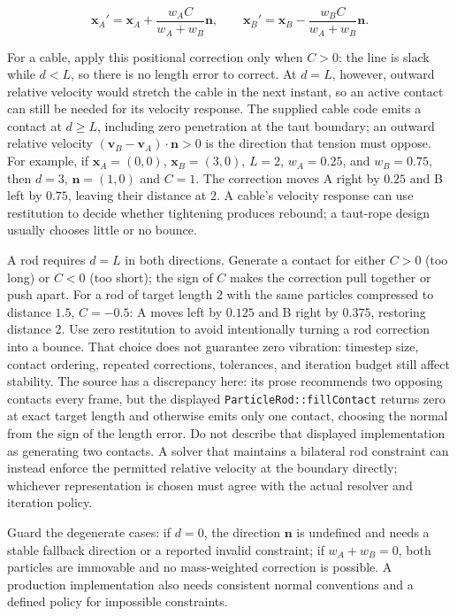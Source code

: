 \[
\mathbf{x}_A' = \mathbf{x}_A + \frac{w_A C}{w_A+w_B}\mathbf{n}, \qquad
\mathbf{x}_B' = \mathbf{x}_B - \frac{w_B C}{w_A+w_B}\mathbf{n}.
\]

For a cable, apply this positional correction only when \(C>0\): the line is slack while \(d<L\), so there is no length error to correct. At \(d=L\), however, outward relative velocity would stretch the cable in the next instant, so an active contact can still be needed for its velocity response. The supplied cable code emits a contact at \(d\geq L\), including zero penetration at the taut boundary; an outward relative velocity \((\mathbf v_B-\mathbf v_A)\cdot\mathbf n>0\) is the direction that tension must oppose. For example, if \(\mathbf{x}_A=(0,0)\), \(\mathbf{x}_B=(3,0)\), \(L=2\), \(w_A=0.25\), and \(w_B=0.75\), then \(d=3\), \(\mathbf{n}=(1,0)\) and \(C=1\). The correction moves A right by \(0.25\) and B left by \(0.75\), leaving their distance at \(2\). A cable's velocity response can use restitution to decide whether tightening produces rebound; a taut-rope design usually chooses little or no bounce.

A rod requires \(d=L\) in both directions. Generate a contact for either \(C>0\) (too long) or \(C<0\) (too short); the sign of \(C\) makes the correction pull together or push apart. For a rod of target length \(2\) with the same particles compressed to distance \(1.5\), \(C=-0.5\): A moves left by \(0.125\) and B right by \(0.375\), restoring distance \(2\). Use zero restitution to avoid intentionally turning a rod correction into a bounce. That choice does not guarantee zero vibration: timestep size, contact ordering, repeated corrections, tolerances, and iteration budget still affect stability. The source has a discrepancy here: its prose recommends two opposing contacts every frame, but the displayed \texttt{ParticleRod::fillContact} returns zero at exact target length and otherwise emits only one contact, choosing the normal from the sign of the length error. Do not describe that displayed implementation as generating two contacts. A solver that maintains a bilateral rod constraint can instead enforce the permitted relative velocity at the boundary directly; whichever representation is chosen must agree with the actual resolver and iteration policy.

Guard the degenerate cases: if \(d=0\), the direction \(\mathbf{n}\) is undefined and needs a stable fallback direction or a reported invalid constraint; if \(w_A+w_B=0\), both particles are immovable and no mass-weighted correction is possible. A production implementation also needs consistent normal conventions and a defined policy for impossible constraints.


